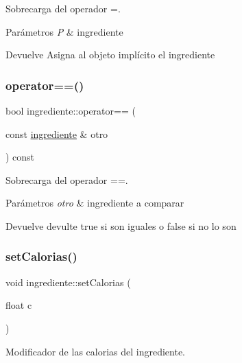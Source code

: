 Sobrecarga del operador =. 


\begin{DoxyParams}{Parámetros}
{\em P} & ingrediente \\
\hline
\end{DoxyParams}
\begin{DoxyReturn}{Devuelve}
Asigna al objeto implícito el ingrediente 
\end{DoxyReturn}
\mbox{\label{classingrediente_aa3bc521369e0ba37383ca0958697f5af}} 
\subsubsection{\texorpdfstring{operator==()}{operator==()}}
{\footnotesize\ttfamily bool ingrediente\+::operator== (\begin{DoxyParamCaption}\item[{const \hyperlink{classingrediente}{ingrediente} \&}]{otro }\end{DoxyParamCaption}) const}



Sobrecarga del operador ==. 


\begin{DoxyParams}{Parámetros}
{\em otro} & ingrediente a comparar \\
\hline
\end{DoxyParams}
\begin{DoxyReturn}{Devuelve}
devulte true si son iguales o false si no lo son 
\end{DoxyReturn}
\mbox{\label{classingrediente_af2f59af7fe9bf623fc6e9fa4e6da5fac}} 
\subsubsection{\texorpdfstring{set\+Calorias()}{setCalorias()}}
{\footnotesize\ttfamily void ingrediente\+::set\+Calorias (\begin{DoxyParamCaption}\item[{float}]{c }\end{DoxyParamCaption})}



Modificador de las calorias del ingrediente. 


